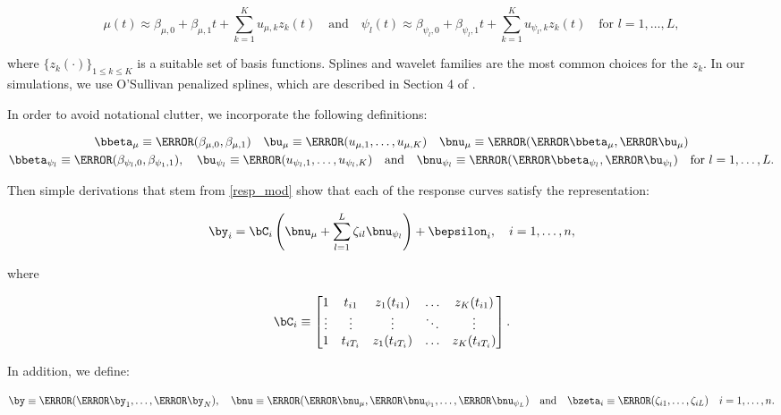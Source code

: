 \documentclass[12pt]{article}
\def\betamu{\bbeta_\mu}
\def\umu{\bu_\mu}
\def\numu{\bnu_\mu}
\newcommand\betapsi[1]{\bbeta_{\psi_{#1}}}
\newcommand\upsi[1]{\bu_{\psi_{#1}}}
\newcommand\nupsi[1]{\bnu_{\psi_{#1}}}
\theoremstyle{plain}
\theoremstyle{definition}
\theoremstyle{remark}
\begin{document}
\[
	\mu (t) \approx \beta_{\mu, 0} + \beta_{\mu, 1} t + \sum_{k=1}^K u_{\mu, k} z_k (t) \quad
	\text{and} \quad
	\psi_l (t) \approx \beta_{\psi_l, 0} + \beta_{\psi_l, 1} t + \sum_{k=1}^K u_{\psi_l, k} z_k (t) \quad
	\text{for $l = 1, \dots, L$},
\]

\noindent where $\{ z_k (\cdot) \}_{1 \le k \le K}$ is a suitable set of
basis functions. Splines and wavelet families are the most common choices for the $z_k$. In our simulations, we
use O'Sullivan penalized splines, which are described in Section 4 of .

In order to avoid notational clutter, we incorporate the following definitions:

\[
\begin{gathered}
	\betamu \equiv \T{(\beta_{\mu, 0}, \beta_{\mu, 1})} \quad
		\umu \equiv \T{(u_{\mu, 1}, \dots, u_{\mu, K})} \quad
		\numu \equiv \T{(\T{\betamu}, \T{\umu})} \\
	\betapsi{l} \equiv \T{(\beta_{\psi_l, 0}, \beta_{\psi_1, 1})}, \quad
		\upsi{l} \equiv \T{(u_{\psi_l, 1}, \dots, u_{\psi_l, K})} \quad
		\text{and} \quad
		\nupsi{l} \equiv \T{(\T{\betapsi{l}}, \T{\upsi{l}})} \quad
		\text{for $l = 1, \dots, L$}.
\end{gathered}
\]

\noindent Then simple derivations that stem from \eqref{resp_mod} show that each of the response curves satisfy the
representation:

\[
	\by_i = \bC_i \left(
		\numu + \sum_{l=1}^L \zeta_{il} \nupsi{l}
	\right) + \bepsilon_{i}, \quad i = 1, \dots, n,
\]

\noindent where

\begin{equation}
	\bC_i \equiv \begin{bmatrix}
		1 & t_{i1} & z_1 (t_{i1}) & \dots & z_K (t_{i1}) \\
		\vdots & \vdots & \vdots & \ddots & \vdots \\
		1 & t_{iT_i} & z_1 (t_{iT_i}) & \dots & z_K (t_{iT_i})
	\end{bmatrix}.
\label{C_mat}
\end{equation}

\noindent In addition, we define:

\begin{equation}
	\by \equiv \T{(\T{\by_1}, \dots, \T{\by_N})}, \quad
	\bnu \equiv \T{(\T{\numu}, \T{\nupsi{1}}, \dots, \T{\nupsi{L}})} \quad
	\text{and} \quad
	\bzeta_i \equiv \T{(\zeta_{i1}, \dots, \zeta_{iL})} \quad i = 1, \dots, n.
\label{partitioned_vectors}
\end{equation}
\end{document}
